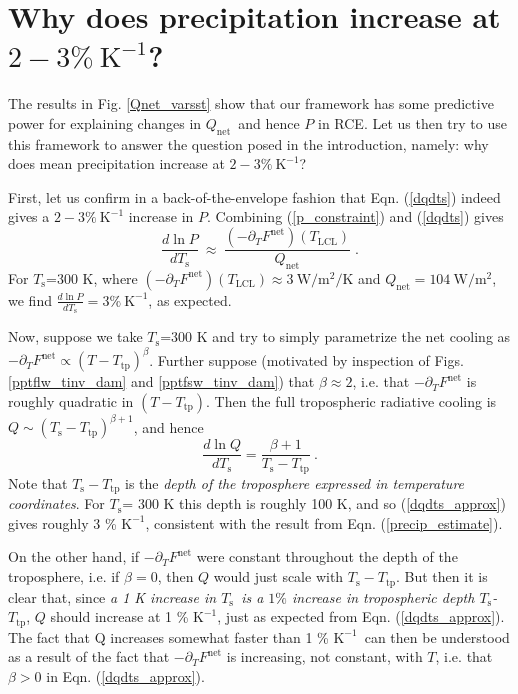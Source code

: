 \documentclass[10pt]{article}
\newcommand{\beqn}{\begin{equation}}
\newcommand{\eeqn}{\end{equation}}
\newcommand{\eqnref}[1]{(\ref{#1})}
\newcommand{\ppt}{\ensuremath{\partial_T}}
\newcommand{\Qnet}{\ensuremath{Q_\mathrm{net}}}
\newcommand{\Fnet}{\ensuremath{F^\mathrm{net}}}
\newcommand{\Wmsq}{\ensuremath{\mathrm{W/m^2}}}
\newcommand{\Ts}{\ensuremath{T_\mathrm{s}}}
\newcommand{\Tlcl}{\ensuremath{T_\mathrm{LCL}}}
\newcommand{\Ttp}{\ensuremath{T_\mathrm{tp}}}
\newcommand{\Kinverse}{\ensuremath{\mathrm{K^{-1}}}}
\begin{document}

\section{Why does precipitation increase at $2 -3\%\ \Kinverse$?} \label{sec_1percent}
The results in Fig. \ref{Qnet_varsst} show that our framework  has some predictive power for explaining changes in \Qnet\ and hence $P$ in RCE. Let us then try to use this framework to answer the question posed in the introduction, namely: why does mean precipitation increase at $2 -3\%\ \Kinverse$?

First, let us confirm in a back-of-the-envelope fashion that Eqn. \eqnref{dqdts} indeed gives a $2 -3\%\ \Kinverse$ increase in $P$. Combining \eqnref{p_constraint} and \eqnref{dqdts} gives
	\beqn
		\frac{d \ln  P}{d \Ts} \ \approx\  \frac{(-\ppt \Fnet)(\Tlcl)}{\Qnet} \; .
	\label{precip_estimate}
	\eeqn
For \Ts=300 K, where $(-\ppt \Fnet)(\Tlcl) \approx 3 \ \Wmsq/\mathrm{K}$ and $\Qnet =  104\ \Wmsq$, we find $\frac{d \ln  P}{d \Ts}=  3\%\ \Kinverse$, as expected.

Now, suppose we take \Ts=300 K and  try to simply parametrize the net cooling as $-\ppt \Fnet \propto (T-\Ttp)^\beta$.  Further suppose (motivated by inspection of Figs. \ref{pptflw_tinv_dam} and \ref{pptfsw_tinv_dam})  that $\beta \approx 2$, i.e. that $-\ppt \Fnet$ is roughly quadratic  in $(T-\Ttp)$. Then the full tropospheric radiative cooling is $Q\sim (\Ts-\Ttp)^{\beta+1}$, and hence 
	\beqn
		\frac{d \ln Q}{d \Ts}  =  \frac{\beta+1}{\Ts-\Ttp}\ . \label{dqdts_approx}
	\eeqn
Note that $\Ts-\Ttp$ is the \emph{depth of the troposphere expressed in temperature coordinates}. For  \Ts= 300 K this depth is roughly 100 K, and so \eqnref{dqdts_approx} gives roughly 3 \% \Kinverse, consistent with the result from Eqn. \eqnref{precip_estimate}.

On the other hand, if $-\ppt \Fnet$ were constant throughout the depth of the troposphere, i.e. if $\beta=0$, then $Q$ would just scale with $\Ts-\Ttp$. But then it is clear that, since \emph{a 1 K increase in \Ts\  is a $1\%$ increase in tropospheric depth \Ts-\Ttp}, $Q$ should increase at 1 \% \Kinverse, just as expected from Eqn. \eqnref{dqdts_approx}. The fact that Q increases somewhat faster than 1 \% \Kinverse\  can then be understood as a result of the fact that $-\ppt \Fnet$ is increasing, not constant, with $T$, i.e. that $\beta>0$ in Eqn. \eqnref{dqdts_approx}.


\end{document}
